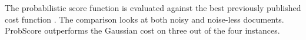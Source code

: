 \documentclass[portrait,final,a0paper,fontscale=0.277]{baposter}
\begin{document}
\begin{poster}
{    \begin{minipage}[t]{0.48\linewidth}
       	\raggedright The probabilistic score function is evaluated against the best previously published cost function \cite{P1,P2}. The comparison looks at both noisy and noise-less documents. \vspace{0.5em} \\ ProbScore outperforms the Gaussian cost on three out of the four instances.
    \end{minipage}
    }
\end{poster}
\end{document}
